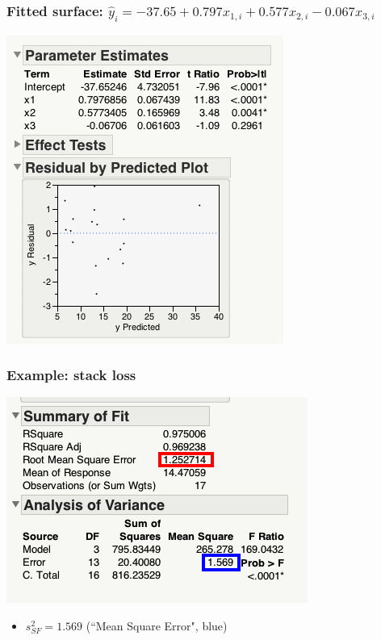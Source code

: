 \documentclass[handout]{beamer}\usepackage[]{graphicx}\usepackage[]{color}
\providecommand{\wh}[1]{\widehat{#1}}
\numberwithin{equation}{section}
\begin{document}
\begin{frame}
\frametitle{Fitted surface: $\wh{y}_i = -37.65 + 0.797 x_{1, i} + 0.577 x_{2, i} - 0.067 x_{3, i}$}
\begin{center}
 \includegraphics{../../fig/stackoutput.png}
\end{center}
\end{frame}


\begin{frame}
\frametitle{Example: stack loss}
\begin{center}
 \includegraphics{../../fig/stackmse.png}
\begin{itemize}
\item $s_{SF}^2 = 1.569$ (``Mean Square Error", blue)
\end{itemize}
\end{center}
\end{frame}
\end{document}
